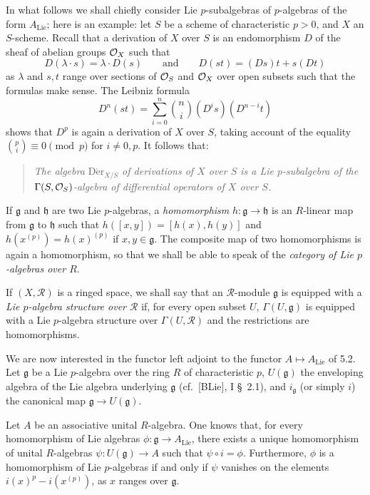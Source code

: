 In what follows we shall chiefly consider Lie $p$-subalgebras of $p$-algebras of the form $A_{\mathrm{Lie}}$; here is an example: let $S$ be a scheme of characteristic $p>0$, and $X$ an $S$-scheme. Recall that a derivation of $X$ over $S$ is an endomorphism $D$ of the sheaf of abelian groups $\mathcal{O}_X$ such that
\[
D(\lambda\cdot s)=\lambda\cdot D(s)\qquad\text{and}\qquad D(st)=(Ds)t+s(Dt)
\]
as $\lambda$ and $s,t$ range over sections of $\mathcal{O}_S$ and $\mathcal{O}_X$ over open subsets such that the formulas make sense. The Leibniz formula
\[
D^n(st)=\sum_{i=0}^n\binom ni(D^is)(D^{n-i}t)
\]
shows that $D^p$ is again a derivation of $X$ over $S$, taking account of the equality $\binom pi\equiv0\pmod p$ for $i\ne0,p$. It follows that:
\begin{quote}\emph{The algebra $\operatorname{D\acute er}_{X/S}$ of derivations of $X$ over $S$ is a Lie $p$-subalgebra of the $\Gamma(S,\mathcal{O}_S)$-algebra of differential operators of $X$ over $S$.}\end{quote}

If $\mathfrak g$ and $\mathfrak h$ are two Lie $p$-algebras, a \emph{homomorphism} $h:\mathfrak g\to\mathfrak h$ is an $R$-linear map from $\mathfrak g$ to $\mathfrak h$ such that $h([x,y])=[h(x),h(y)]$ and $h(x^{(p)})=h(x)^{(p)}$ if $x,y\in\mathfrak g$. The composite map of two homomorphisms is again a homomorphism, so that we shall be able to speak of the \emph{category of Lie $p$-algebras over $R$}.

If $(X,\mathscr R)$ is a ringed space, we shall say that an $\mathscr R$-module $\mathfrak g$ is equipped with a \emph{Lie $p$-algebra structure over $\mathscr R$} if, for every open subset $U$, $\Gamma(U,\mathfrak g)$ is equipped with a Lie $p$-algebra structure over $\Gamma(U,\mathscr R)$ and the restrictions are homomorphisms.

We are now interested in the functor left adjoint to the functor $A\mapsto A_{\mathrm{Lie}}$ of 5.2. Let $\mathfrak g$ be a Lie $p$-algebra over the ring $R$ of characteristic $p$, $U(\mathfrak g)$ the enveloping algebra of the Lie algebra underlying $\mathfrak g$ (cf.\ [BLie], I \S~2.1), and $i_{\mathfrak g}$ (or simply $i$) the canonical map $\mathfrak g\to U(\mathfrak g)$.

Let $A$ be an associative unital $R$-algebra. One knows that, for every homomorphism of Lie algebras $\phi:\mathfrak g\to A_{\mathrm{Lie}}$, there exists a unique homomorphism of unital $R$-algebras $\psi:U(\mathfrak g)\to A$ such that $\psi\circ i=\phi$. Furthermore, $\phi$ is a homomorphism of Lie $p$-algebras if and only if $\psi$ vanishes on the elements $i(x)^p-i(x^{(p)})$, as $x$ ranges over $\mathfrak g$.

